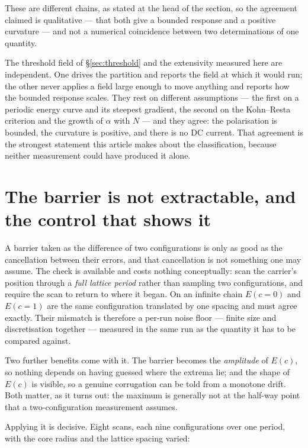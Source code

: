 \documentclass[11pt]{article}
\begin{document}
These are different chains, as stated at the head of the section, so the agreement claimed is
qualitative --- that both give a bounded response and a positive curvature --- and not a numerical
coincidence between two determinations of one quantity.

The threshold field of \S\ref{sec:threshold} and the extensivity measured here are independent. One
drives the partition and reports the field at which it would run; the other never applies a field
large enough to move anything and reports how the bounded response scales. They rest on different
assumptions --- the first on a periodic energy curve and its steepest gradient, the second on the
Kohn--Resta criterion and the growth of $\alpha$ with $N$ --- and they agree: the polarisation is
bounded, the curvature is positive, and there is no DC current. That agreement is the strongest
statement this article makes about the classification, because neither measurement could have
produced it alone.


\section{The barrier is not extractable, and the control that shows it}\label{sec:mesh}

A barrier taken as the difference of two configurations is only as good as the cancellation between
their errors, and that cancellation is not something one may assume. The check is available and
costs nothing conceptually: scan the carrier's position through a \emph{full lattice period} rather
than sampling two configurations, and require the scan to return to where it began. On an infinite
chain $E(c{=}0)$ and $E(c{=}1)$ are the same configuration translated by one spacing and must agree
exactly. Their mismatch is therefore a per-run noise floor --- finite size and discretisation
together --- measured in the same run as the quantity it has to be compared against.

Two further benefits come with it. The barrier becomes the \emph{amplitude} of $E(c)$, so nothing
depends on having guessed where the extrema lie; and the shape of $E(c)$ is visible, so a genuine
corrugation can be told from a monotone drift. Both matter, as it turns out: the maximum is
generally not at the half-way point that a two-configuration measurement assumes.

Applying it is decisive. Eight scans, each nine configurations over one period, with the core
radius and the lattice spacing varied:
\end{document}
